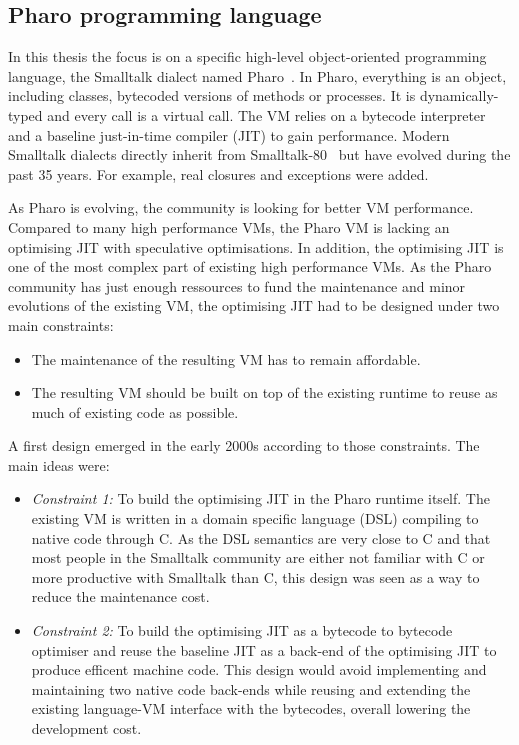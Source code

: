 \documentclass[a4paper,12pt,twoside]{../includes/ThesisStyle}
\begin{document}
\subsection{Pharo programming language}

In this thesis the focus is on a specific high-level object-oriented programming language, the Smalltalk dialect named Pharo~\cite{Blac09a}. In Pharo, everything is an object, including classes, bytecoded versions of methods or processes. It is dynamically-typed and every call is a virtual call. The VM relies on a bytecode interpreter and a baseline just-in-time compiler (JIT) to gain performance. Modern Smalltalk dialects directly inherit from Smalltalk-80~\cite{Gold83a} but have evolved during the past 35 years. For example, real closures and exceptions were added.

As Pharo is evolving, the community is looking for better VM performance. Compared to many high performance VMs, the Pharo VM is lacking an optimising JIT with speculative optimisations. In addition, the optimising JIT is one of the most complex part of existing high performance VMs. As the Pharo community has just enough ressources to fund the maintenance and minor evolutions of the existing VM, the optimising JIT had to be designed under two main constraints:
\begin{itemize}
\item The maintenance of the resulting VM has to remain affordable.
\item The resulting VM should be built on top of the existing runtime to reuse as much of existing code as possible.
\end{itemize}

A first design emerged in the early 2000s according to those constraints. The main ideas were:
\begin{itemize}
	\item \emph{Constraint 1:} To build the optimising JIT in the Pharo runtime itself. The existing VM is written in a domain specific language (DSL) compiling to native code through C. As the DSL semantics are very close to C and that most people in the Smalltalk community are either not familiar with C or more productive with Smalltalk than C, this design was seen as a way to reduce the maintenance cost.
	\item \emph{Constraint 2:} To build the optimising JIT as a bytecode to bytecode optimiser and reuse the baseline JIT as a back-end of the optimising JIT to produce efficent machine code. This design would avoid implementing and maintaining two native code back-ends while reusing and extending the existing language-VM interface with the bytecodes, overall lowering the development cost.
\end{itemize}
\end{document}

